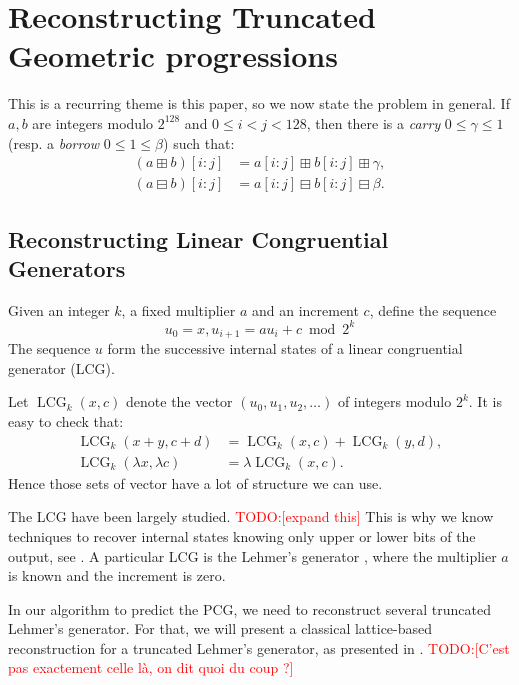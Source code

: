 \documentclass[submission,svgnames,journal=tosc]{iacrtrans}
\DeclareMathOperator{\LCG}{LCG}
\newcommand{\todo}[1]{\textcolor{red}{TODO:[#1]}}
\begin{document}
\section{Reconstructing Truncated Geometric progressions}
\label{sec:geometric}


This is a recurring theme is this paper, so we now state the problem in
general. If $a, b$ are integers modulo $2^{128}$ and $0\leq i<j<128$, then there
is a \emph{carry} $0 \leq \gamma \leq 1$ (resp. a \emph{borrow}
$0 \leq 1 \leq \beta$) such that:
\begin{align}
  (a \boxplus b)[i:j]  &= a[i:j] \boxplus  b[i:j] \boxplus  \gamma, \label{eq:caryy}  \\
  (a \boxminus b)[i:j] &= a[i:j] \boxminus b[i:j] \boxminus \beta.  \label{eq:borrow}
\end{align}

\subsection{Reconstructing Linear Congruential Generators}

Given an integer \(k\), a fixed multiplier \(a\) and an increment \(c\), define the
sequence \[u_0 = x, u_{i+1} = a u_i + c \bmod 2^k\] The sequence \(u\) form the
successive internal states of a linear congruential generator (LCG). 

Let $\LCG_{k}(x, c)$ denote the vector $(u_0, u_1, u_2, \dots)$ of integers
modulo $2^k$.  It is easy to check that:
\begin{align}
\label{eq:lcg-additive}
\LCG_{k}(x + y, c + d) &= \LCG_{k}(x, c) + \LCG_{k}(y, d),  \\
\label{eq:lcg-scalar}
\LCG_{k}(\lambda x, \lambda c) &= \lambda \LCG_{k}(x, c).   
\end{align}
Hence those sets of vector have a lot of structure we can use.

The LCG have been largely studied. \todo{expand this} This is why we know techniques to recover internal states knowing only upper or lower bits of the output, see \cite{Boyar1989}. A particular LCG is the Lehmer's generator \cite{Lehmer}, where the multiplier \(a\) is known and the increment is zero.

In our algorithm to predict the PCG, we need to reconstruct several truncated Lehmer's generator. For that, we will present a classical lattice-based reconstruction for a truncated Lehmer's generator, as presented in \cite{Frieze}. \todo{C'est pas exactement celle là, on dit quoi du coup ?}
\end{document}
